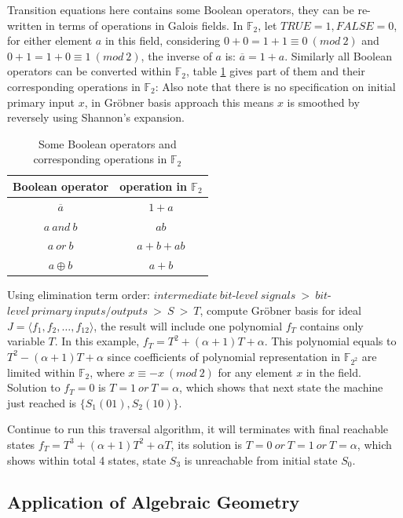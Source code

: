 Transition equations here contains some Boolean operators, they can be re-written in terms of operations in Galois fields. 
In $\mathbb{F}_{2}$, let $TRUE = 1, FALSE = 0$, for either element $a$ in this field, considering $0 + 0 = 1 + 1 \equiv 0\ (mod\ 2)$
and $0 + 1 = 1 + 0 \equiv 1\ (mod\ 2)$, the inverse of $a$ is: $\overline{a} = 1 + a$. Similarly all Boolean operators
can be converted within $\mathbb{F}_{2}$, table \ref{table:booltogalois_op} gives part of them and their corresponding
operations in $\mathbb{F}_{2}$:
Also note that there is no specification on initial primary input $x$, in Gr\"obner basis approach this means $x$ is smoothed by
reversely using Shannon's expansion.
\begin{table}
\centering
\begin{tabular}{|c|c|} \hline
Boolean operator & operation in $\mathbb{F}_{2}$\\ \hline
$\overline{a}$ & $1 + a$\\ \hline
$a\ and\ b$ & $ab$\\ \hline
$a\ or\ b$ & $a + b + ab$\\ \hline
$a \oplus b$ & $a + b$\\
\hline\end{tabular}
\caption{Some Boolean operators and corresponding operations in $\mathbb{F}_{2}$}
\label{table:booltogalois_op}
\end{table}
Using elimination term order: $intermediate\ bit$-$level\ signals\ >\ bit$-$level\ primary\ inputs/outputs\ >\ S\ >\ T$, compute Gr\"obner basis for ideal
$J = \langle f_1, f_2, \dots, f_{12}\rangle $, the result will include one polynomial $f_T$ contains only variable $T$. In this example,
$f_T = T^2+(\alpha+1)T+\alpha$. This polynomial equals to $T^2-(\alpha+1)T+\alpha$ since coefficients of polynomial representation in $\mathbb{F}_{2^2}$ are
limited within $\mathbb{F}_{2}$, where $x \equiv -x\ (mod\ 2)$ for any element $x$ in the field. Solution to $f_T = 0$ is $T = 1\ or \ T = \alpha$, which shows that next
state the machine just reached is $\{S_1(01), S_2(10)\}$.

Continue to run this traversal algorithm, it will terminates with final reachable states $f_T = T^3+(\alpha+1)T^2+\alpha T$, its solution is $T=0\ or\ T=1\ or\ T=\alpha$,
which shows within total 4 states, state $S_3$ is unreachable from initial state $S_0$.

\subsection{Application of Algebraic Geometry}

